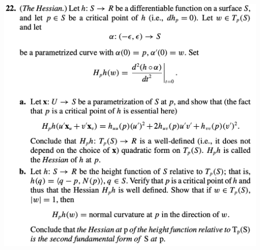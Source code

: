 \documentclass{report}
\begin{document}
\begin{question}{}{}
\includegraphics[height=18cm,width=18cm]{hw5q11}
\end{question}
\end{document}
